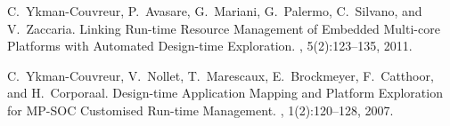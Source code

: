 \documentclass[smallextended]{svjour3}
\begin{document}
\begin{thebibliography}{10}
C.~Ykman-Couvreur, P.~Avasare, G.~Mariani, G.~Palermo, C.~Silvano, and
  V.~Zaccaria.
\newblock Linking Run-time Resource Management of Embedded Multi-core Platforms
  with Automated Design-time Exploration.
, 5(2):123--135, 2011.

C.~Ykman-Couvreur, V.~Nollet, T.~Marescaux, E.~Brockmeyer, F.~Catthoor, and
  H.~Corporaal.
\newblock Design-time Application Mapping and Platform Exploration for MP-SOC
  Customised Run-time Management.
, 1(2):120--128, 2007.

\end{thebibliography}




\end{document}
